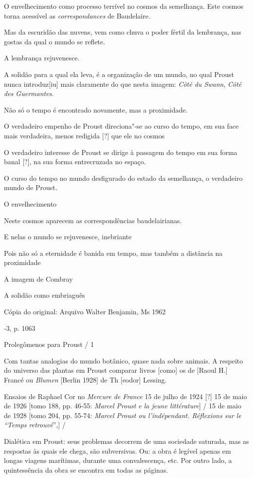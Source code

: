 O envelhecimento como processo terrível no cosmos da semelhança. Este
cosmos torna acessível as \emph{correspondances} de Baudelaire.

Mas da escuridão das nuvens, vem como chuva o poder fértil da lembrança,
nas gostas da qual o mundo se reflete.

A lembrança rejuvenesce.

A solidão para a qual ela leva, é a organização de um mundo, no qual
Proust nunca introduz{[}iu{]} mais claramente do que nesta imagem:
\emph{Côté du Swann}, \emph{Côté des Guermantes}.

Não só o tempo é encontrado novamente, mas a proximidade.

O verdadeiro empenho de Proust direciona"-se ao curso do tempo, em sua
face mais verdadeira, menos redigida {[}?{]} que ele no cosmos

O verdadeiro interesse de Proust se dirige à passagem do tempo em sua
forma banal {[}?{]}, na sua forma entrecruzada no espaço.

O curso do tempo no mundo desfigurado do estado da semelhança, o
verdadeiro mundo de Proust.

O envelhecimento

Neste cosmos aparecem as correspondências baudelairianas.

E nelas o mundo se rejuvenesce, inebriante

Pois não só a eternidade é banida em tempo, mas também a distância na
proximidade

A imagem de Combray

A solidão como embriaguês

Cópia do original: Arquivo Walter Benjamin, Ms 1962

-3, p. 1063

Prolegômenos para Proust / 1

Com tantas analogias do mundo botânico, quase nada sobre animais. A
respeito do universo das plantas em Proust comparar livros {[}como{]} os
de {[}Raoul H.{]} Francé ou \emph{Blumen} {[}Berlin 1928{]} de Th
{[}eodor{]} Lessing.

Ensaios de Raphael Cor no \emph{Mercure de France} 15 de julho de 1924
{[}?{]} 15 de maio de 1926 {[}tomo 188, pp. 46-55: \emph{Marcel Proust e
la jeune littérature}{]} / 15 de maio de 1928 {[}tomo 204, pp. 55-74:
\emph{Marcel Proust ou l'indépendant. Réflexions sur le ``Temps
retrouvé}'',{]} /

Dialética em Proust: seus problemas decorrem de uma sociedade saturada,
mas as respostas às quais ele chega, são subversivas. Ou: a obra é
legível apenas em longas viagens marítimas, durante uma convalescença,
etc. Por outro lado, a quintessência da obra se encontra em todas as
páginas.

